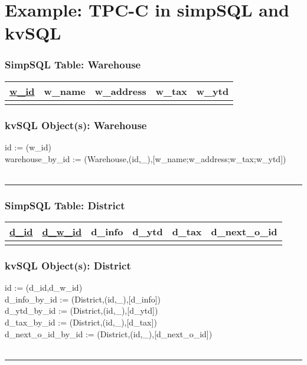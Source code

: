 \documentclass[12pt,letter]{article}
\begin{document}
\section{Example: TPC-C in simpSQL and kvSQL}

\subsubsection*{SimpSQL Table: Warehouse}  
\begin{tabular}{ |c|c|c|c|c| }
 \hline
 \underline{w\_id} & w\_name & w\_address & w\_tax & w\_ytd \\
 \hline
 &   &   & & \\
 \hline
\end{tabular}

\subsubsection*{kvSQL Object(s): Warehouse}  
id := (w\_id) \\
warehouse\_by\_id :=
(Warehouse,(id,\_),[w\_name;w\_address;w\_tax;w\_ytd]) 
\\ \\
\hrule

\subsubsection*{SimpSQL Table: District}  
\begin{tabular}{ |c|c|c|c|c|c| }
 \hline
 \underline{d\_id} & \underline{d\_w\_id} & d\_info & d\_ytd & d\_tax & d\_next\_o\_id\\
 \hline
 &   &   & & &\\
 \hline
\end{tabular}

\subsubsection*{kvSQL Object(s): District}  
 id := (d\_id,d\_w\_id) \\
 d\_info\_by\_id := 
(District,(id,\_),[d\_info])  \\
 d\_ytd\_by\_id := 
(District,(id,\_),[d\_ytd])  \\
 d\_tax\_by\_id := 
(District,(id,\_),[d\_tax])  \\
 d\_next\_o\_id\_by\_id := 
(District,(id,\_),[d\_next\_o\_id])  \\
\\ 
\hrule
\end{document}

